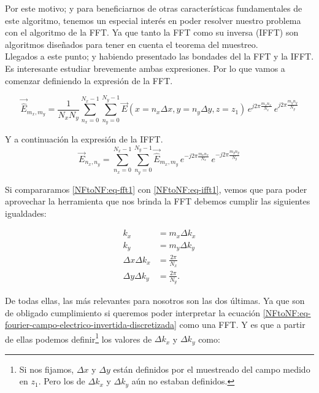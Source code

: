 \documentclass{article}
\begin{document}
Por este motivo; y para beneficiarnos de otras características fundamentales de este algoritmo, tenemos un especial interés en poder resolver nuestro problema con el algoritmo de la FFT. Ya que tanto la FFT como su inversa (IFFT) son algoritmos diseñados para tener en cuenta el teorema del muestreo.
\\

Llegados a este punto; y habiendo presentado las bondades del la FFT y la IFFT. Es interesante estudiar brevemente ambas expresiones. Por lo que vamos a comenzar definiendo la expresión de la FFT. 

\begin{equation}
\vec{\hat{E}}_{m_{x},m_{y}}=\frac{1}{N_{x} N_{y}}
\sum_{n_{x}=0}^{N_{x}-1}\sum_{n_{y}=0}^{N_{y}-1}
\vec{E}(x=n_{x}\Delta x,y=n_{y} \Delta y,z=z_{1}) \,e^{j 2\pi
\frac{m_{x} n_{x}}{N_{x}}}\,e^{j 2\pi \frac{m_{y} n_{y}}{N_{y}}}
\label{NFtoNF:eq-fft1}
\end{equation}

Y a continuación la expresión de la IFFT.
\begin{equation}
\vec{E}_{n_{x},n_{y}}=
\sum_{n_{x}=0}^{N_{x}-1}\sum_{n_{y}=0}^{N_{y}-1}
\vec{\hat{E}}_{m_{x},m_{y}} \,e^{-j 2\pi \frac{m_{x}
n_{x}}{N_{x}}}\,e^{-j 2\pi \frac{m_{y} n_{y}}{N_{y}}}
\label{NFtoNF:eq-ifft1}
\end{equation}

\newpage

Si compararamos  \eqref{NFtoNF:eq-fft1} con \eqref{NFtoNF:eq-ifft1}, vemos que para
poder aprovechar la herramienta que nos brinda la FFT debemos cumplir las siguientes igualdades:

\begin{subequations}
\begin{align}
k_{x}&= m_{x}\Delta k_{x}
\\
k_{y}&= m_{y}\Delta k_{y}
\\
\Delta x \Delta k_{x}&=\frac{2\pi}{N_{x}}
\\
\Delta y \Delta k_{y}&=\frac{2\pi}{N_{y}}.
\end{align}
\end{subequations}

De todas ellas, las más relevantes para nosotros son las dos últimas. Ya que son de obligado
cumplimiento si queremos poder interpretar la ecuación \eqref{NFtoNF:eq-fourier-campo-electrico-invertida-discretizada} como
una FFT. Y es que a partir de ellas podemos definir\footnote{Si nos fijamos, $\Delta x$ y $\Delta y$ están
definidos por el muestreado del campo medido en $z_1$. Pero los de $\Delta k_{x}$ y $\Delta k_{y}$ aún no estaban definidos.} los valores de $\Delta k_{x}$ y
$\Delta k_{y}$ como:
\end{document}
